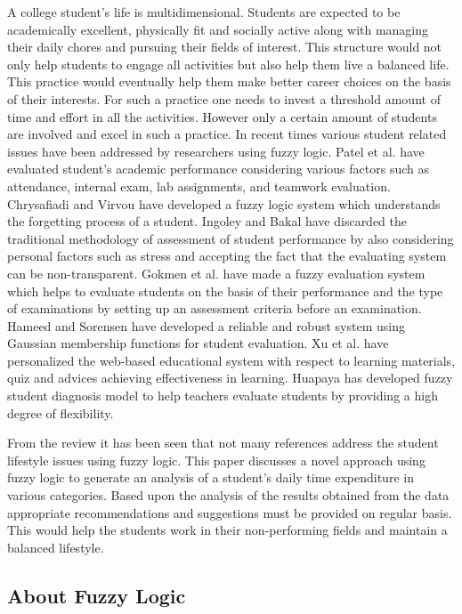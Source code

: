 \documentclass[conference]{IEEEtran}
\begin{document}
A college student\rq s life is multidimensional. Students are expected to be academically excellent, physically fit and socially active along with managing their daily chores and pursuing their fields of interest. This structure would not only help students to engage all activities but also help them live a balanced life. This practice would eventually help them make better career choices on the basis of their interests. For such a practice one needs to invest a threshold amount of time and effort in all the activities. However only a certain amount of students are involved and excel in such a practice. In recent times various student related issues have been addressed by researchers using fuzzy logic. Patel et al. \cite{Patel} have evaluated student\rq s academic performance considering various factors such as attendance, internal exam, lab assignments, and teamwork evaluation. Chrysafiadi and Virvou \cite{Chrysafiadi2015} have developed a fuzzy logic system which understands the forgetting process of a student. Ingoley and Bakal \cite{Ingoley} have discarded the traditional methodology of assessment of student performance by also considering personal factors such as stress and accepting the fact that the evaluating system can be non-transparent. Gokmen et al. \cite{GOKMEN2010902} have made a fuzzy evaluation system which helps to evaluate students on the basis of their performance and the type of examinations by setting up an assessment criteria before an examination. Hameed and Sorensen \cite{Hameed} have developed a reliable and robust system using Gaussian membership functions for student evaluation. Xu et al. \cite{Xu:2002:ISP:820741.820940} have personalized the web-based educational system with respect to learning materials, quiz and advices achieving effectiveness in learning. Huapaya \cite{Huapaya} has developed fuzzy student diagnosis model to help teachers evaluate students by providing a high degree of flexibility.

From the review it has been seen that not many references address the student lifestyle issues using fuzzy logic. This paper discusses a novel approach using fuzzy logic to generate an analysis of a student\rq s daily time expenditure in various categories. Based upon the analysis of the results obtained from the data appropriate recommendations and suggestions must be provided on regular basis. This would help the students work in their non-performing fields and maintain a balanced lifestyle.

\subsection{About Fuzzy Logic}
\end{document}
